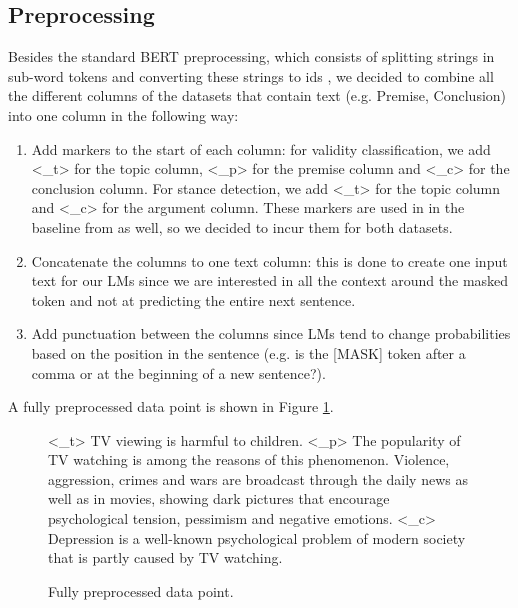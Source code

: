 \newpage

\subsection{Preprocessing}

Besides the standard BERT preprocessing, which consists of splitting strings in sub-word tokens and converting these strings to ids \cite{bertprepro}, we decided to combine all the different columns of the datasets that contain text (e.g. Premise, Conclusion) into one column in the following way:
\begin{enumerate}
	\item Add markers to the start of each column: for validity classification, we add <\_t> for the topic column, <\_p> for the premise column and <\_c> for the conclusion column. For stance detection, we add <\_t> for the topic column and <\_c> for the argument column. These markers are used in in the baseline from \cite{argsvalidnovel2022} as well, so we decided to incur them for both datasets.
	\item Concatenate the columns to one text column: this is done to create one input text for our LMs since we are interested in all the context around the masked token and not at predicting the entire next sentence.
	\item Add punctuation between the columns since LMs tend to change probabilities based on the position in the sentence (e.g. is the [MASK] token after a comma or at the beginning of a new sentence?).
\end{enumerate}

A fully preprocessed data point is shown in Figure \ref{fig:exampleprep}.

\begin{figure}[H]
	\begin{displayquote}
		<\_t> TV viewing is harmful to children. <\_p> The popularity of TV watching is among the reasons of this phenomenon. 		Violence, aggression, crimes and wars are broadcast through the daily news as well as in movies, showing dark 					pictures that encourage psychological tension, pessimism and negative emotions. <\_c> Depression is a well-known 				psychological problem of modern society that is partly caused by TV watching.
	\end{displayquote}
	\caption{Fully preprocessed data point.}%
  	\label{fig:exampleprep}
\end{figure}











